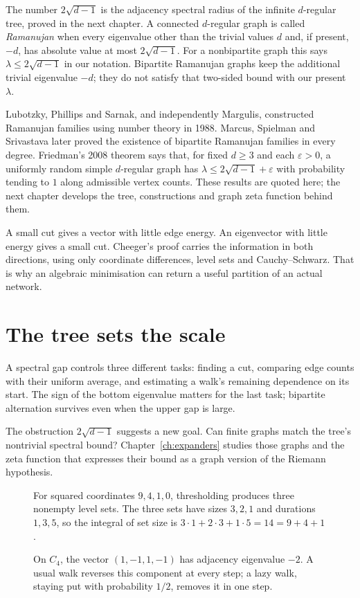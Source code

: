 The number $2\sqrt{d-1}$ is the adjacency spectral radius of the infinite $d$-regular tree, proved in the next chapter. A connected $d$-regular graph is called \emph{Ramanujan} when every eigenvalue other than the trivial values $d$ and, if present, $-d$, has absolute value at most $2\sqrt{d-1}$. For a nonbipartite graph this says $\lambda\le2\sqrt{d-1}$ in our notation. Bipartite Ramanujan graphs keep the additional trivial eigenvalue $-d$; they do not satisfy that two-sided bound with our present $\lambda$.

Lubotzky, Phillips and Sarnak, and independently Margulis, constructed Ramanujan families using number theory in 1988. Marcus, Spielman and Srivastava later proved the existence of bipartite Ramanujan families in every degree. Friedman's 2008 theorem says that, for fixed $d\ge3$ and each $\varepsilon>0$, a uniformly random simple $d$-regular graph has $\lambda\le2\sqrt{d-1}+\varepsilon$ with probability tending to $1$ along admissible vertex counts. These results are quoted here; the next chapter develops the tree, constructions and graph zeta function behind them.

\begin{beauty}
A small cut gives a vector with little edge energy. An eigenvector with little energy gives a small cut. Cheeger's proof carries the information in both directions, using only coordinate differences, level sets and Cauchy--Schwarz. That is why an algebraic minimisation can return a useful partition of an actual network.
\end{beauty}

\section{The tree sets the scale}

A spectral gap controls three different tasks: finding a cut, comparing edge counts with their uniform average, and estimating a walk's remaining dependence on its start. The sign of the bottom eigenvalue matters for the last task; bipartite alternation survives even when the upper gap is large.

The obstruction $2\sqrt{d-1}$ suggests a new goal. Can finite graphs match the tree's nontrivial spectral bound? Chapter~\ref{ch:expanders} studies those graphs and the zeta function that expresses their bound as a graph version of the Riemann hypothesis.

\begin{figure}[ht]
\centering{}
\caption{For squared coordinates $9,4,1,0$, thresholding produces three nonempty level sets. The three sets have sizes $3,2,1$ and durations $1,3,5$, so the integral of set size is $3\cdot1+2\cdot3+1\cdot5=14=9+4+1$.}
\label{fig:v8c06levels}
\end{figure}
\begin{figure}[ht]
\centering{}
\caption{On $C_4$, the vector $(1,-1,1,-1)$ has adjacency eigenvalue $-2$. A usual walk reverses this component at every step; a lazy walk, staying put with probability $1/2$, removes it in one step.}
\label{fig:v8c06bipartite}
\end{figure}

